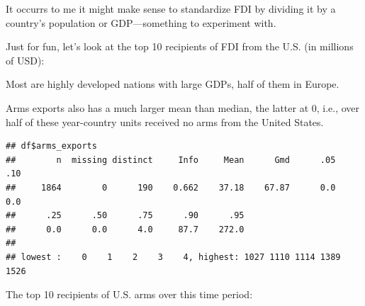 \documentclass[12pt,]{article}
\newenvironment{Shaded}{\begin{snugshade}}{\end{snugshade}}
\newcommand{\CommentTok}[1]{\textcolor[rgb]{0.56,0.35,0.01}{\textit{#1}}}
\newcommand{\KeywordTok}[1]{\textcolor[rgb]{0.13,0.29,0.53}{\textbf{#1}}}
\newcommand{\NormalTok}[1]{#1}
\newcommand{\OperatorTok}[1]{\textcolor[rgb]{0.81,0.36,0.00}{\textbf{#1}}}
\begin{document}
It occurrs to me it might make sense to standardize FDI by dividing it
by a country's population or GDP---something to experiment with.

Just for fun, let's look at the top 10 recipients of FDI from the U.S.
(in millions of USD):

\begin{Shaded}
\end{Shaded}

Most are highly developed nations with large GDPs, half of them in
Europe.

Arms exports also has a much larger mean than median, the latter at 0,
i.e., over half of these year-country units received no arms from the
United States.

\begin{Shaded}
\end{Shaded}

\begin{verbatim}
## df$arms_exports 
##        n  missing distinct     Info     Mean      Gmd      .05      .10 
##     1864        0      190    0.662    37.18    67.87      0.0      0.0 
##      .25      .50      .75      .90      .95 
##      0.0      0.0      4.0     87.7    272.0 
## 
## lowest :    0    1    2    3    4, highest: 1027 1110 1114 1389 1526
\end{verbatim}

The top 10 recipients of U.S. arms over this time period:

\begin{Shaded}
\end{Shaded}
\end{document}
